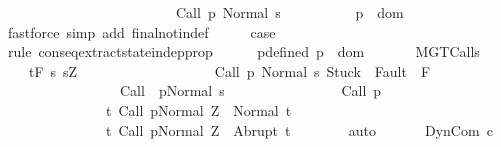 \begin{isabellebody}
\ \ \ \ \ \ \ \ \ \ \ \ \ \ \ \ \ \ \ \ \ \ \ \ \ {\isasymGamma}{\isasymturnstile}Call\ p{\isasymdown}\ Normal\ s{\isacharbraceright}{\isachardot}\isanewline
\ \ \ \ \ \ \ \ \ \ p\ {\isasymin}\ dom\ {\isasymGamma}{\isachardoublequoteclose}\isanewline
\ \ \ \ \isamarkupfalse%
\ {\isacharparenleft}fastforce\ simp\ add{\isacharcolon}\ final{\isacharunderscore}notin{\isacharunderscore}def{\isacharparenright}\isanewline
\ \ \isamarkupfalse%
\ \isamarkupfalse%
\ {\isacharquery}case\isanewline
\ \ \isamarkupfalse%
\ {\isacharparenleft}rule\ conseq{\isacharunderscore}extract{\isacharunderscore}state{\isacharunderscore}indep{\isacharunderscore}prop{\isacharparenright}\isanewline
\ \ \ \ \isamarkupfalse%
\ p{\isacharunderscore}defined{\isacharcolon}\ {\isachardoublequoteopen}p\ {\isasymin}\ dom\ {\isasymGamma}{\isachardoublequoteclose}\isanewline
\ \ \ \ \isamarkupfalse%
\ MGT{\isacharunderscore}Calls\ \isamarkupfalse%
\isanewline
\ \ \ \ {\isachardoublequoteopen}{\isasymGamma}{\isacharcomma}{\isasymTheta}{\isasymturnstile}\isactrlsub t\isactrlbsub {\isacharslash}F\ \isactrlesub {\isacharbraceleft}s{\isachardot}\ s{\isacharequal}Z\ {\isasymand}\ \isanewline
\ \ \ \ \ \ \ \ \ \ \ \ \ \ \ \ \ {\isasymGamma}{\isasymturnstile}{\isasymlangle}Call\ p\ {\isacharcomma}Normal\ s{\isasymrangle}\ {\isasymRightarrow}{\isasymnotin}{\isacharparenleft}{\isacharbraceleft}Stuck{\isacharbraceright}\ {\isasymunion}\ Fault\ {\isacharbackquote}\ {\isacharparenleft}{\isacharminus}F{\isacharparenright}{\isacharparenright}{\isasymand}\isanewline
\ \ \ \ \ \ \ \ \ \ \ \ \ \ \ \ \ {\isasymGamma}{\isasymturnstile}Call\ \ p{\isasymdown}Normal\ s{\isacharbraceright}\isanewline
\ \ \ \ \ \ \ \ \ \ \ \ \ \ \ \ {\isacharparenleft}Call\ p{\isacharparenright}\isanewline
\ \ \ \ \ \ \ \ \ \ \ \ \ \ \ {\isacharbraceleft}t{\isachardot}\ {\isasymGamma}{\isasymturnstile}{\isasymlangle}Call\ p{\isacharcomma}Normal\ Z{\isasymrangle}\ {\isasymRightarrow}\ Normal\ t{\isacharbraceright}{\isacharcomma}\isanewline
\ \ \ \ \ \ \ \ \ \ \ \ \ \ \ {\isacharbraceleft}t{\isachardot}\ {\isasymGamma}{\isasymturnstile}{\isasymlangle}Call\ p{\isacharcomma}Normal\ Z{\isasymrangle}\ {\isasymRightarrow}\ Abrupt\ t{\isacharbraceright}{\isachardoublequoteclose}\isanewline
\ \ \ \ \ \ \isamarkupfalse%
\ {\isacharparenleft}auto{\isacharparenright}\isanewline
\ \ \isamarkupfalse%
\isanewline
{}\isamarkupfalse%
\isanewline
\ \ \isamarkupfalse%
\ {\isacharparenleft}DynCom\ c{\isacharparenright}\isanewline

\end{isabellebody}
